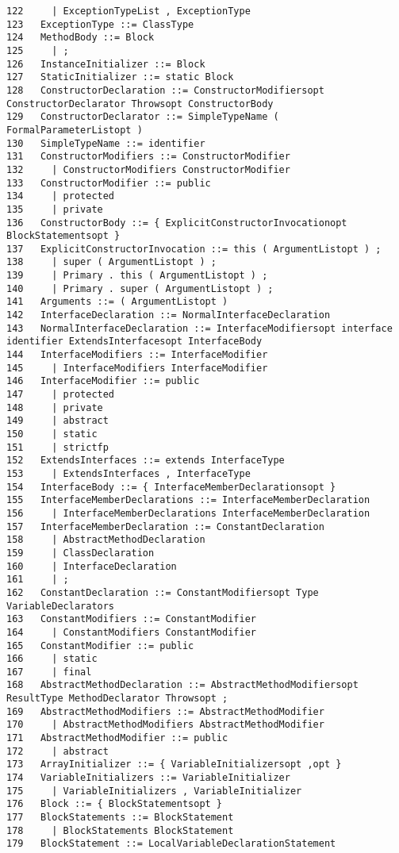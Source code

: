 \begin{verbatim}
122     | ExceptionTypeList , ExceptionType
123   ExceptionType ::= ClassType
124   MethodBody ::= Block
125     | ;
126   InstanceInitializer ::= Block
127   StaticInitializer ::= static Block
128   ConstructorDeclaration ::= ConstructorModifiersopt ConstructorDeclarator Throwsopt ConstructorBody
129   ConstructorDeclarator ::= SimpleTypeName ( FormalParameterListopt )
130   SimpleTypeName ::= identifier
131   ConstructorModifiers ::= ConstructorModifier
132     | ConstructorModifiers ConstructorModifier
133   ConstructorModifier ::= public
134     | protected
135     | private
136   ConstructorBody ::= { ExplicitConstructorInvocationopt BlockStatementsopt }
137   ExplicitConstructorInvocation ::= this ( ArgumentListopt ) ;
138     | super ( ArgumentListopt ) ;
139     | Primary . this ( ArgumentListopt ) ;
140     | Primary . super ( ArgumentListopt ) ;
141   Arguments ::= ( ArgumentListopt )
142   InterfaceDeclaration ::= NormalInterfaceDeclaration
143   NormalInterfaceDeclaration ::= InterfaceModifiersopt interface identifier ExtendsInterfacesopt InterfaceBody
144   InterfaceModifiers ::= InterfaceModifier
145     | InterfaceModifiers InterfaceModifier
146   InterfaceModifier ::= public
147     | protected
148     | private
149     | abstract
150     | static
151     | strictfp
152   ExtendsInterfaces ::= extends InterfaceType
153     | ExtendsInterfaces , InterfaceType
154   InterfaceBody ::= { InterfaceMemberDeclarationsopt }
155   InterfaceMemberDeclarations ::= InterfaceMemberDeclaration
156     | InterfaceMemberDeclarations InterfaceMemberDeclaration
157   InterfaceMemberDeclaration ::= ConstantDeclaration
158     | AbstractMethodDeclaration
159     | ClassDeclaration
160     | InterfaceDeclaration
161     | ;
162   ConstantDeclaration ::= ConstantModifiersopt Type VariableDeclarators
163   ConstantModifiers ::= ConstantModifier
164     | ConstantModifiers ConstantModifier
165   ConstantModifier ::= public
166     | static
167     | final
168   AbstractMethodDeclaration ::= AbstractMethodModifiersopt ResultType MethodDeclarator Throwsopt ;
169   AbstractMethodModifiers ::= AbstractMethodModifier
170     | AbstractMethodModifiers AbstractMethodModifier
171   AbstractMethodModifier ::= public
172     | abstract
173   ArrayInitializer ::= { VariableInitializersopt ,opt }
174   VariableInitializers ::= VariableInitializer
175     | VariableInitializers , VariableInitializer
176   Block ::= { BlockStatementsopt }
177   BlockStatements ::= BlockStatement
178     | BlockStatements BlockStatement
179   BlockStatement ::= LocalVariableDeclarationStatement

\end{verbatim}
